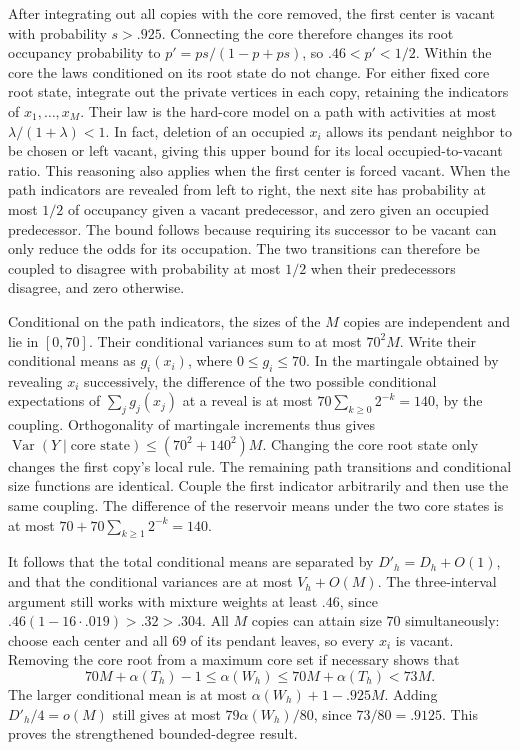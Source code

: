 \documentclass[11pt,a4paper]{article}
\numberwithin{equation}{section}
\begin{document}
After integrating out all copies with the core removed, the first center
is vacant with probability $s> .925$. Connecting the core therefore
changes its root occupancy probability to
$p'=ps/(1-p+ps)$, so $.46<p'<1/2$.
Within the core the laws conditioned on its root state do not change.
For either fixed core root state, integrate out the private vertices in
each copy, retaining the indicators of $x_1,\ldots,x_M$. Their law is
the hard-core model on a path with activities at most
$\lambda/(1+\lambda)<1$. In fact, deletion of an occupied $x_i$
allows its pendant neighbor to be chosen or left vacant, giving this
upper bound for its local occupied-to-vacant ratio. This reasoning
also applies when the first center is forced vacant.
When the path indicators are revealed from left to right, the next site
has probability at most $1/2$ of occupancy given a vacant predecessor,
and zero given an occupied predecessor. The bound follows because requiring
its successor to be vacant can only reduce the odds for its occupation.
The two transitions can therefore be coupled to disagree with probability
at most $1/2$ when their predecessors disagree, and zero otherwise.

Conditional on the path indicators, the sizes of the $M$ copies are
independent and lie in $[0,70]$. Their conditional variances sum to at
most $70^2M$. Write their conditional means as $g_i(x_i)$, where
$0\le g_i\le70$. In the martingale obtained by revealing $x_i$
successively, the difference of the two possible conditional expectations
of $\sum_jg_j(x_j)$ at a reveal is at most
$70\sum_{k\ge0}2^{-k}=140$, by the coupling. Orthogonality of martingale
increments thus gives $\operatorname{Var}(Y\mid\text{core state})
\le (70^2+140^2)M$. Changing the core root state only changes the
first copy's local rule. The remaining path transitions and conditional
size functions are identical. Couple the first indicator arbitrarily and
then use the same coupling. The difference of the reservoir means under
the two core states is at most
$70+70\sum_{k\ge1}2^{-k}=140$.

It follows that the total conditional means are separated by
$D'_h=D_h+O(1)$, and that the conditional variances are at most
$V_h+O(M)$. The three-interval argument still works with mixture weights
at least $.46$, since $.46(1-16\cdot.019)>.32>.304$.
All $M$ copies can attain size $70$ simultaneously: choose each center
and all $69$ of its pendant leaves, so every $x_i$ is vacant. Removing
the core root from a maximum core set if necessary shows that
\[
 70M+\alpha(T_h)-1\le\alpha(W_h)\le 70M+\alpha(T_h)<73M .
\]
The larger conditional mean is at most $\alpha(W_h)+1-.925M$.
Adding $D'_h/4=o(M)$ still gives at most $79\alpha(W_h)/80$, since
$73/80=.9125$. This proves the strengthened bounded-degree result.
\end{document}
